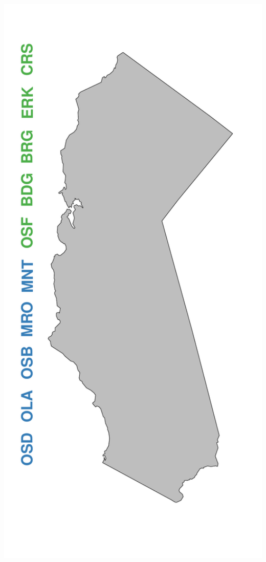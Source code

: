 \documentclass[ xcolor = pdftex, dvipsnames, table ]{beamer}
\begin{document}
\begin{frame}
{\begin{minipage}[h!]{0.19\textwidth}
\end{minipage}
\begin{minipage}[h!]{0.19\textwidth}
        \hspace*{-0.25cm}
        \includegraphics[width=1.2\textwidth]{../pictures/mapFullHalfHalf.pdf}

\end{minipage}}
\end{frame}
\end{document}
